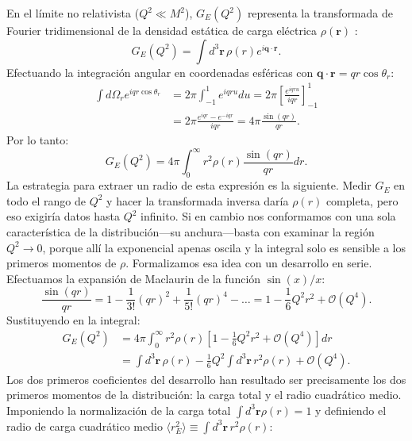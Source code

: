 \documentclass[10pt,a4paper]{article}
\begin{document}
En el límite no relativista ($Q^2 \ll M^2$), $G_E(Q^2)$ representa la transformada de Fourier tridimensional de la densidad estática de carga eléctrica $\rho(\mathbf{r})$ \cite{hofstadter1956,hofstadter1961,das2003,perdrisat2007}:
\begin{equation}
G_E(Q^2) = \int d^3\mathbf{r} \, \rho(r) e^{i \mathbf{q} \cdot \mathbf{r}}.
\end{equation}
Efectuando la integración angular en coordenadas esféricas con $\mathbf{q} \cdot \mathbf{r} = q r \cos\theta_r$:
\begin{align}
\int d\Omega_r e^{i q r \cos\theta_r} &= 2\pi \int_{-1}^1 e^{i q r u} du = 2\pi \left[ \frac{e^{i q r u}}{i q r} \right]_{-1}^1 \nonumber \\
&= 2\pi \frac{e^{i q r} - e^{-i q r}}{i q r} = 4\pi \frac{\sin(q r)}{q r}.
\end{align}
Por lo tanto:
\begin{equation}
G_E(Q^2) = 4\pi \int_0^\infty r^2 \rho(r) \frac{\sin(q r)}{q r} dr.
\end{equation}
La estrategia para extraer un radio de esta expresión es la siguiente. Medir $G_E$ en todo el rango de $Q^2$ y hacer la transformada inversa daría $\rho(r)$ completa, pero eso exigiría datos hasta $Q^2$ infinito. Si en cambio nos conformamos con una sola característica de la distribución---su anchura---basta con examinar la región $Q^2 \to 0$, porque allí la exponencial apenas oscila y la integral solo es sensible a los primeros momentos de $\rho$. Formalizamos esa idea con un desarrollo en serie. Efectuamos la expansión de Maclaurin de la función $\sin(x)/x$:
\begin{equation}
\frac{\sin(q r)}{q r} = 1 - \frac{1}{3!} (q r)^2 + \frac{1}{5!} (q r)^4 - \dots = 1 - \frac{1}{6} Q^2 r^2 + \mathcal{O}(Q^4).
\end{equation}
Sustituyendo en la integral:
\begin{align}
G_E(Q^2) &= 4\pi \int_0^\infty r^2 \rho(r) \left[ 1 - \frac{1}{6} Q^2 r^2 + \mathcal{O}(Q^4) \right] dr \nonumber \\
&= \int d^3\mathbf{r} \, \rho(r) - \frac{1}{6} Q^2 \int d^3\mathbf{r} \, r^2 \rho(r) + \mathcal{O}(Q^4).
\end{align}
Los dos primeros coeficientes del desarrollo han resultado ser precisamente los dos primeros momentos de la distribución: la carga total y el radio cuadrático medio. Imponiendo la normalización de la carga total $\int d^3\mathbf{r} \rho(r) = 1$ y definiendo el radio de carga cuadrático medio $\langle r_E^2 \rangle \equiv \int d^3\mathbf{r} \, r^2 \rho(r)$:
\end{document}

